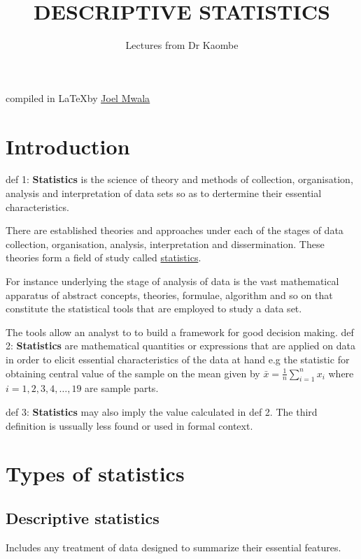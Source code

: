 \documentclass[12pt]{article}
\title{DESCRIPTIVE STATISTICS}
\author{Lectures from Dr Kaombe}
\begin{document}
\maketitle
\vspace*{11cm}
\begin{center}
    compiled in \LaTeX \nobreakspace by \href{https://bento.me/joelmwala}{\underline{Joel Mwala}}
\end{center}

\newpage
\tableofcontents


\newpage

\section{Introduction}
\setlength{\parskip}{0.5em} %
def 1: \textbf{Statistics} is the science of theory and methods of collection, organisation, analysis and interpretation of data sets so as to dertermine their essential characteristics.

There are established theories and approaches under each of the stages of data collection, organisation, analysis, interpretation and dissermination. These theories form a field of study called \underline{statistics}.

For instance underlying the stage of analysis of data is the vast mathematical apparatus of abstract concepts, theories, formulae, algorithm and so on that constitute the statistical tools that are employed to study a data set.

The tools allow an analyst to to build a framework for good decision making.
\newline
def 2: \textbf{Statistics} are mathematical quantities or expressions that are applied on data in order to elicit essential characteristics of the data at hand e.g the statistic for obtaining central value of the sample on the mean given by $\bar{x} = \frac{1}{n}\sum_{i = 1}^{n} x_i$ where $i = 1,2,3,4, \dots,19$ are sample parts.

def 3: \textbf{Statistics} may also imply the value calculated in def 2.
The third definition is ussually less found or used in formal context.
\newpage

\section{Types of statistics}
\subsection{Descriptive statistics}
Includes any treatment of data designed to summarize their essential features.
\end{document}
